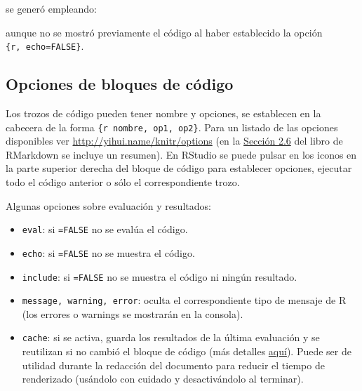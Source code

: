 \documentclass[
]{book}
\newenvironment{Shaded}{\begin{snugshade}}{\end{snugshade}}
\newcommand{\InformationTok}[1]{\textcolor[rgb]{0.56,0.35,0.01}{\textbf{\textit{#1}}}}
\providecommand{\tightlist}{%
  \setlength{\itemsep}{0pt}\setlength{\parskip}{0pt}}
\theoremstyle{break}
\theoremstyle{nonumberplain}
\begin{document}
se generó empleando:

\begin{Shaded}
\end{Shaded}

aunque no se mostró previamente el código al haber establecido la opción \texttt{\textasciigrave{}\textasciigrave{}\textasciigrave{}\{r,\ echo=FALSE\}}.

\subsection{Opciones de bloques de código}\label{opcodigo}

Los trozos de código pueden tener nombre y opciones, se establecen en la cabecera de la forma
\texttt{\textasciigrave{}\textasciigrave{}\textasciigrave{}\{r\ nombre,\ op1,\ op2\}}.
Para un listado de las opciones disponibles ver \url{http://yihui.name/knitr/options}
(en la \href{https://bookdown.org/yihui/rmarkdown/r-code.html}{Sección 2.6} del libro de RMarkdown se incluye un resumen).
En RStudio se puede pulsar en los iconos en la parte superior derecha del bloque de código para establecer opciones, ejecutar todo el código anterior o sólo el correspondiente trozo.

Algunas opciones sobre evaluación y resultados:

\begin{itemize}
\tightlist
\item
  \texttt{eval}: si \texttt{=FALSE} no se evalúa el código.
\item
  \texttt{echo}: si \texttt{=FALSE} no se muestra el código.
\item
  \texttt{include}: si \texttt{=FALSE} no se muestra el código ni ningún resultado.
\item
  \texttt{message,\ warning,\ error}: oculta el correspondiente tipo de mensaje de R
  (los errores o warnings se mostrarán en la consola).
\item
  \texttt{cache}: si se activa, guarda los resultados de la última evaluación
  y se reutilizan si no cambió el bloque de código
  (más detalles \href{https://yihui.name/knitr/options/\#cache}{aquí}).
  Puede ser de utilidad durante la redacción del documento para reducir el tiempo de renderizado
  (usándolo con cuidado y desactivándolo al terminar).
\end{itemize}
\end{document}
